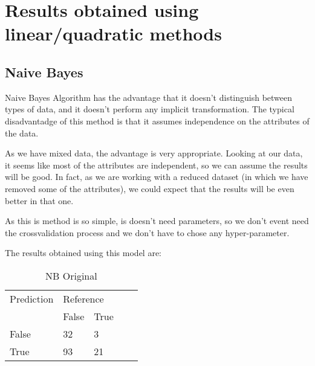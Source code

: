 %
\section{Results obtained using linear/quadratic methods}


\subsection{Naive Bayes}

Naive Bayes Algorithm has the advantage that it doesn't distinguish between types of data, and it doesn't perform any implicit transformation. The typical disadvantadge of this method is that it assumes independence on the attributes of the data.

As we have mixed data, the advantage is very appropriate. Looking at our data, it seems like most of the attributes are independent, so we can assume the results will be good. In fact, as we are working with a reduced dataset (in which we have removed some of the attributes), we could expect that the results will be even better in that one.

As this is method is so simple, is doesn't need parameters, so we don't event need the crossvalidation process and we don't have to chose any hyper-parameter.

The results obtained using this model are:



\begin{table}[!htbp]
\centering
\caption{NB Original}
\vspace{0.1cm}
\label{nb-orig}
\begin{tabular}{|l|ll|ll}
\cline{1-3}
Prediction & \multicolumn{2}{l|}{Reference} &  &  \\
           & False          & True          &  &  \\ \cline{2-3}
False      & 32              & 3             &  &  \\
True       & 93              & 21             &  &  \\ \cline{1-3}
\end{tabular}
\end{table}

